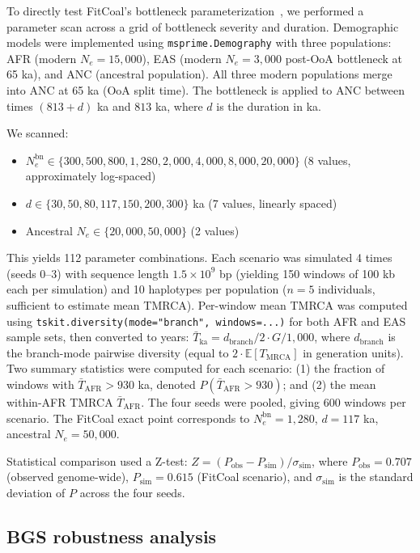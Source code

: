 To directly test FitCoal's bottleneck parameterization~\citep{Hu2023}, we performed a parameter scan across a grid of bottleneck severity and duration. Demographic models were implemented using \texttt{msprime.Demography} with three populations: AFR (modern $N_e = 15{,}000$), EAS (modern $N_e = 3{,}000$ post-OoA bottleneck at 65 ka), and ANC (ancestral population). All three modern populations merge into ANC at 65 ka (OoA split time). The bottleneck is applied to ANC between times $(813 + d)$ ka and $813$ ka, where $d$ is the duration in ka.

We scanned:
\begin{itemize}
  \item $N_e^{\text{bn}} \in \{300, 500, 800, 1{,}280, 2{,}000, 4{,}000, 8{,}000, 20{,}000\}$ (8 values, approximately log-spaced)
  \item $d \in \{30, 50, 80, 117, 150, 200, 300\}$ ka (7 values, linearly spaced)
  \item Ancestral $N_e \in \{20{,}000, 50{,}000\}$ (2 values)
\end{itemize}

This yields 112 parameter combinations. Each scenario was simulated 4 times (seeds 0--3) with sequence length $1.5 \times 10^9$ bp (yielding 150 windows of 100 kb each per simulation) and 10 haplotypes per population ($n = 5$ individuals, sufficient to estimate mean TMRCA). Per-window mean TMRCA was computed using \texttt{tskit.diversity(mode="branch", windows=...)} for both AFR and EAS sample sets, then converted to years: $\bar{T}_\text{ka} = d_\text{branch}/2 \cdot G / 1{,}000$, where $d_\text{branch}$ is the branch-mode pairwise diversity (equal to $2 \cdot \mathbb{E}[T_\text{MRCA}]$ in generation units). Two summary statistics were computed for each scenario: (1) the fraction of windows with $\bar{T}_\text{AFR} > 930$ ka, denoted $P(\bar{T}_\text{AFR} > 930)$; and (2) the mean within-AFR TMRCA $\bar{T}_\text{AFR}$. The four seeds were pooled, giving 600 windows per scenario. The FitCoal exact point corresponds to $N_e^{\text{bn}} = 1{,}280$, $d = 117$ ka, ancestral $N_e = 50{,}000$.

Statistical comparison used a Z-test: $Z = (P_\text{obs} - P_\text{sim})/\sigma_\text{sim}$, where $P_\text{obs} = 0.707$ (observed genome-wide), $P_\text{sim} = 0.615$ (FitCoal scenario), and $\sigma_\text{sim}$ is the standard deviation of $P$ across the four seeds.

\subsection*{BGS robustness analysis}

